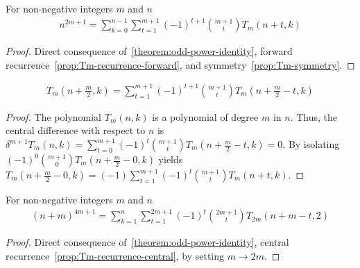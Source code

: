 \begin{proposition}
    \label{prop:odd-power-decomposition-forward-shifted}
    For non-negative integers $m$ and $n$
    \begin{align*}
        n^{2m+1} = \sum_{k=0}^{n-1} \sum_{t=1}^{m+1} (-1)^{t+1} \binom{m+1}{t} T_{m} (n+t, k)
    \end{align*}
    \begin{proof}
        Direct consequence of~\eqref{theorem:odd-power-identity},
        forward recurrence~\eqref{prop:Tm-recurrence-forward}, and symmetry~\eqref{prop:Tm-symmetry}.
    \end{proof}
\end{proposition}

\begin{proposition}
    \label{prop:Tm-recurrence-central}
    \begin{align*}
        T_{m} \left(n + \frac{m}{2}, k \right)
        = \sum_{t=1}^{m+1} (-1)^{t+1} \binom{m+1}{t} T_{m} \left( n+\frac{m}{2}-t, k \right)
    \end{align*}
    \begin{proof}
        The polynomial $T_{m} (n,k)$ is a polynomial of degree $m$ in $n$.
        Thus, the central difference with respect to $n$ is
        $\delta^{m+1} T_{m} (n, k) = \sum_{t=0}^{m+1} (-1)^{t} \binom{m+1}{t} T_{m} \left(n+\frac{m}{2} - t, k\right) = 0$.
        By isolating $(-1)^{0} \binom{m+1}{0} T_{m} \left(n+\frac{m}{2}-0, k\right)$ yields
        $T_{m} \left(n+\frac{m}{2}-0, k\right) = (-1) \sum_{t=1}^{m+1} (-1)^{t} \binom{m+1}{t} T_{m} (n+t, k)$.
    \end{proof}
\end{proposition}

\begin{proposition} For non-negative integers $m$ and $n$
    \label{prop:odd-power-decomposition-central}
    \begin{align*}
    (n+m)
        ^{4m+1} = \sum_{k=1}^{n} \sum_{t=1}^{2m+1} (-1)^{t} \binom{2m+1}{t} T_{2m} (n+m-t, 2)
    \end{align*}
    \begin{proof}
        Direct consequence of~\eqref{theorem:odd-power-identity}, central recurrence~\eqref{prop:Tm-recurrence-central},
        by setting $m \rightarrow 2m$.
    \end{proof}
\end{proposition}

